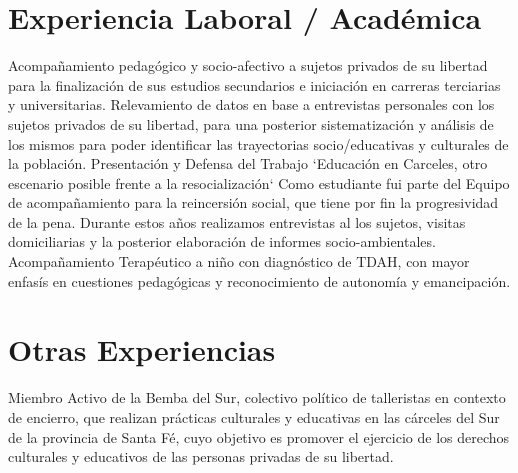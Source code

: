 \documentclass[11pt,a4paper,sans]{moderncv}        %
\begin{document}
\section{Experiencia Laboral / Acad\'emica}
  {
    Acompañamiento pedagógico y socio-afectivo a sujetos privados de su libertad para la finalización de sus estudios secundarios e iniciación en carreras terciarias y universitarias.
  }
\vspace{3mm}
  {
    Relevamiento de datos en base a entrevistas personales con los sujetos privados de su libertad, para una posterior sistematización y análisis de los mismos para poder identificar las trayectorias socio/educativas y culturales de la población.  
  }
\vspace{3mm}
  {
    Presentación y Defensa del Trabajo `Educación en Carceles, otro escenario posible frente a la resocialización`
  }
\vspace{3mm}
  {
    Como estudiante fui parte del Equipo de acompañamiento para la reincersión social, que tiene por fin la progresividad de la pena. Durante estos años realizamos entrevistas al los sujetos, visitas domiciliarias y la posterior elaboración de informes socio-ambientales.
  }
\vspace{3mm}
  {
    Acompañamiento Terap\'eutico a niño con diagnóstico de TDAH, con mayor enfasís en cuestiones pedagógicas y reconocimiento de autonomía y emancipación.
  }
\vspace{2mm}

\section{Otras Experiencias}
  {
    Miembro Activo de la Bemba del Sur, colectivo político de talleristas en contexto de encierro, que realizan prácticas culturales y educativas en las cárceles del Sur de la provincia de Santa Fé, cuyo objetivo es promover el ejercicio de los derechos culturales y educativos de las personas privadas de su libertad.
  }
\end{document}
